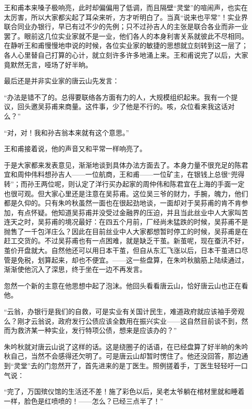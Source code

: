 \par 王和甫本来嗓子极响亮，此时却偏偏用了低调，而且隔壁“灵堂”的喧闹声，也实在太厉害，所以大家都尖起了耳朵来听，方才听明白了。当真“说来也平常”！实业界联合同业办银行，早已有过不少的先例；只不过孙吉人的主张是联合各业而非一业罢了。眼前这几位实业家就不是一业，他们各人的本身利害关系就彼此不尽相同。在静听王和甫慢慢地申说的时候，各位实业家的敏捷的思想就立刻转到这一层了；各人心里替自己打算的心计，就立刻许多许多地涌上来。王和甫说完了以后，大家竟默然无言，哑场了好半晌。
\par 最后还是并非实业家的唐云山先发言：
\par “办法是错不了的。总得要联络各方面有力的人，大规模组织起来。我有一个提议，回头邀吴荪甫来商量。这件事，少了他是不行的。咳，众位看来我这话对么？”
\par “对，对！我和孙吉翁本来就有这个意思。”
\par 王和甫接着说，他的声音又和平常一样响亮了。
\par 于是大家都来发表意见，渐渐地谈到具体办法方面去了。本身力量不很充足的陈君宜和周仲伟料想孙吉人——一位航商，王和甫——一位矿主，在银钱上总很“兜得转”；而孙王两位呢，则认定了洋行买办起家的周仲伟和陈君宜在上海的手面一定也很可观。但大家心里还是注意在吴荪甫。这位吴三爷的财力，手腕，魄力，他们都是久仰的。只有朱吟秋虽然一面也在很起劲地谈，一面却对于吴荪甫的肯不肯参加，有点怀疑。他知道吴荪甫并没受过金融界的压迫，并且当此丝业中人大家叫苦连天之时，吴荪甫的境况最好：在四五个月前，厂经尚未猛跌的时候，吴荪甫不是抛售了一千包洋庄么？因此在目前丝业中人大家都想暂时停工的时候，吴荪甫是在赶工交货的。不过吴荪甫也有一点困难，就是缺乏干茧。新茧呢，现在蚕汛不好，茧价开盘就大。自然他还可以用日本干茧，但自从东汇飞涨以后，日本干茧进口尽管是免税，划算起来，却也不便宜。——这一些盘算，在朱吟秋脑筋上陆续通过，渐渐使他沉入了深思，终于坐在一边不再发言。
\par 忽然一个新的主意在他思想中起了泡沫。他回头看看唐云山，恰好唐云山也正在看他。
\par “云翁，办银行是我们的自救，可是实业有关国计民生，难道政府就应该袖手旁观么？刚才云翁说，政府发行公债应该全数用在振兴实业——这自然目前谈不到，然而为救济某一种实业，发行特项公债，想来是应该办的？”
\par 朱吟秋就对唐云山说了这样的话。这是绕圈子的话语，在已经盘算了好半晌的朱吟秋自己，当然不会感得还欠明了。可是唐云山却暂时愣住了。他还没回答，那边通到“灵堂”去的门忽然开了，首先进来的是丁医生。照例搓着手，丁医生轻轻吁一口气说：
\par “完了，万国殡仪馆的生活还不差！施了彩色以后，吴老太爷躺在棺材里就和睡着一样，脸色是红喷喷的！——怎么？已经三点半了！”
